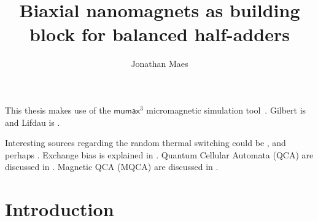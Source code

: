 \documentclass[10pt,a4paper]{article}
\author{Jonathan Maes}
\title{Biaxial nanomagnets as building block for balanced half-adders}
\newcommand{\mumax}{$\mathsf{mumax}^3$}
\begin{document}
\begin{titlingpage}
\maketitle
\end{titlingpage}

\newpage
{}

{\hypersetup{linkcolor=black}
\tableofcontents
}
\newpage
{}

This thesis makes use of the \mumax{} micromagnetic simulation tool~\cite{MuMax3}.
Gilbert is \cite{Gilbert1956} and Lifdau is \cite{LANDAU1992}.

Interesting sources regarding the random thermal switching could be \cite{ThermFluc_SingleDomain, RandomSwitch_MonteCarlo, Nonmonotonic_reversal}, and perhaps \cite{MagDynamics_JumpNoise}.
Exchange bias is explained in \cite{ExchangeBias, ExchangeBias_nanostructures, ExchangeBias_Mechanisms}.
Quantum Cellular Automata (QCA) are discussed in \cite{QCA_Algorithms, QCA_GameOfLife}. Magnetic QCA (MQCA) are discussed in \cite{MQCA_MajorityGate, MQCA_RoomTemp, MQCA_ImageRecognition}.

\section{Introduction}
\end{document}
